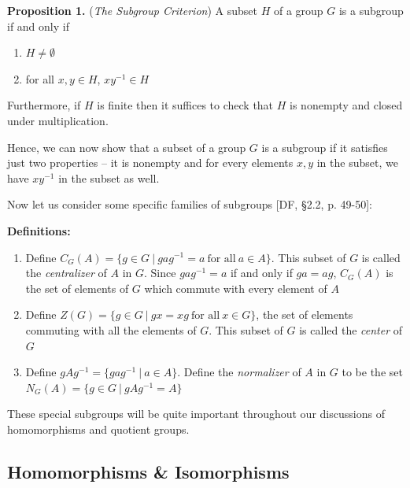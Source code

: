 \documentclass[11pt, reqno]{amsart}
\theoremstyle{plain}
\theoremstyle{definition}
\theoremstyle{example}
\begin{document}
\par
\textbf{Proposition 1.} (\textit{The Subgroup Criterion}) A subset $H$ of a group $G$ is a subgroup if and only if
\begin{enumerate}
\item $H \neq \emptyset$

\item for all $x, y \in H$, $xy^{-1} \in H$
\end{enumerate}

Furthermore, if $H$ is finite then it suffices to check that $H$ is nonempty and closed under multiplication.

\par
Hence, we can now show that a subset of a group $G$ is a subgroup if it satisfies just two properties -- it is nonempty and for every elements $x, y$ in the subset, we have $xy^{-1}$ in the subset as well.

\par
Now let us consider some specific families of subgroups [DF, \S 2.2, p. 49-50]:

\par
\textbf{Definitions:}
\begin{enumerate}

\item Define $C_G(A) = \{g \in G \ | \ gag^{-1} = a \ \text{for all} \ a \in A\}$. This subset of $G$ is called the \textit{centralizer} of $A$ in $G$. Since $gag^{-1} = a$ if and only if $ga = ag$, $C_G(A)$ is the set of elements of $G$ which commute with every element of $A$

\item Define $Z(G) = \{g \in G \ | \ gx = xg \ \text{for all} \ x \in G\}$, the set of elements commuting with all the elements of $G$. This subset of $G$ is called the \textit{center} of $G$

\item Define $gAg^{-1} = \{gag^{-1} \ | \ a \in A\}$. Define the \textit{normalizer} of $A$ in $G$ to be the set $N_G(A) = \{g \in G \ | \ gAg^{-1} = A\}$
\end{enumerate}

\par
These special subgroups will be quite important throughout our discussions of homomorphisms and quotient groups.

\subsection{Homomorphisms \& Isomorphisms}
\end{document}
